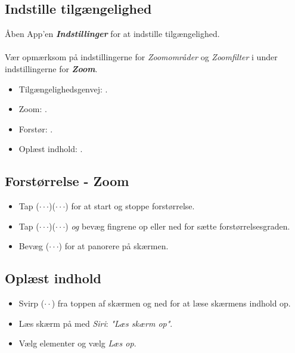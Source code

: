 \documentclass[a4paper, landscape, 10pt]{scrartcl}
\begin{document}
\begin{multicols}{2}
\end{multicols}

\newpage
\hrulefill{}
\begin{multicols}{2}

\subsection*{Indstille tilgængelighed}
Åben App'en \textbf{\textit{Indstillinger \faCogs}} for at indstille tilgængelighed. \\ \\
Vær opmærksom på indstillingerne for \emph{Zoomområder} og \emph{Zoomfilter} i under indstillingerne for \textbf{\emph{Zoom}}.
\begin{itemize}
  \item {Tilgængelighedsgenvej: .}
  \item {Zoom: .}
  \item {Forstør: .}
  \item {Oplæst indhold: .}
\end{itemize}

\subsection*{Forstørrelse - Zoom}
\begin{itemize}
  \item {Tap ($\cdot\cdot\cdot$)($\cdot\cdot\cdot$) for at start og stoppe forstørrelse.}
  \item {Tap ($\cdot\cdot\cdot$)($\cdot\cdot\cdot$) \emph{og} bevæg fingrene op eller ned for sætte forstørrelsesgraden.}
  \item {Bevæg ($\cdot\cdot\cdot$) for at panorere på skærmen.}
\end{itemize}

\subsection*{Oplæst indhold}
\begin{itemize}
  \item {Svirp ($\cdot\cdot$) fra toppen af skærmen og ned for at læse skærmens indhold op.}
  \item {Læs skærm på med \emph{Siri}: \textit{"Læs skærm op"}.}
  \item {Vælg elementer og vælg \emph{Læs op}.}
\end{itemize}


\end{multicols}
\end{document}
